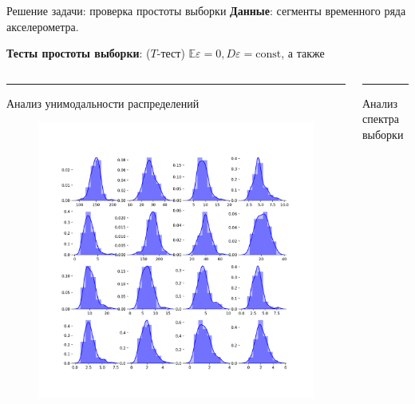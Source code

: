 \documentclass{beamer}
\newcommand{\eps}{\varepsilon}
\begin{document}
\begin{frame}{Решение задачи: проверка простоты выборки}
    \textbf{Данные}: сегменты временного ряда акселерометра.

    \textbf{Тесты простоты выборки}: ($T$-тест) $\mathbb{E} \eps = 0, D \eps = \mathrm{const}$, а также

    \begin{columns}[T] %
        \begin{column}{.48\textwidth}
        \color{blue}\rule{\linewidth}{4pt}

        Анализ унимодальности распределений

    \begin{figure}[ht]
        \centering
          \includegraphics[width=\textwidth]{../pics/features_unimodality_short.png}
    \end{figure}

        \end{column}%
        \hfill%
        \begin{column}{.48\textwidth}
        \color{blue}\rule{\linewidth}{4pt}

        Анализ спектра выборки


\end{column}
\end{columns}
\end{frame}
\end{document}
